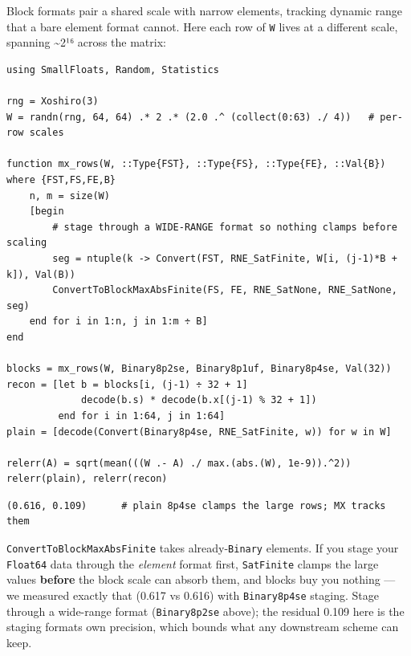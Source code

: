 \label{18175628149299408468}{}


Block formats pair a shared scale with narrow elements, tracking dynamic range that a bare element format cannot. Here each row of \texttt{W} lives at a different scale, spanning {\textasciitilde}2¹⁶ across the matrix:




\begin{verbatim}
using SmallFloats, Random, Statistics

rng = Xoshiro(3)
W = randn(rng, 64, 64) .* 2 .* (2.0 .^ (collect(0:63) ./ 4))   # per-row scales

function mx_rows(W, ::Type{FST}, ::Type{FS}, ::Type{FE}, ::Val{B}) where {FST,FS,FE,B}
    n, m = size(W)
    [begin
        # stage through a WIDE-RANGE format so nothing clamps before scaling
        seg = ntuple(k -> Convert(FST, RNE_SatFinite, W[i, (j-1)*B + k]), Val(B))
        ConvertToBlockMaxAbsFinite(FS, FE, RNE_SatNone, RNE_SatNone, seg)
    end for i in 1:n, j in 1:m ÷ B]
end

blocks = mx_rows(W, Binary8p2se, Binary8p1uf, Binary8p4se, Val(32))
recon = [let b = blocks[i, (j-1) ÷ 32 + 1]
             decode(b.s) * decode(b.x[(j-1) % 32 + 1])
         end for i in 1:64, j in 1:64]
plain = [decode(Convert(Binary8p4se, RNE_SatFinite, w)) for w in W]

relerr(A) = sqrt(mean(((W .- A) ./ max.(abs.(W), 1e-9)).^2))
relerr(plain), relerr(recon)
\end{verbatim}




\begin{verbatim}
(0.616, 0.109)      # plain 8p4se clamps the large rows; MX tracks them
\end{verbatim}



\begin{tcolorbox}[toptitle=-1mm,bottomtitle=1mm,colback=admonition-warning!50!white,colframe=admonition-warning,title=\textbf{Stage wide, then block-quantize}]
\texttt{ConvertToBlockMaxAbsFinite} takes already-\texttt{Binary} elements. If you stage your \texttt{Float64} data through the \emph{element} format first, \texttt{SatFinite} clamps the large values \textbf{before} the block scale can absorb them, and blocks buy you nothing — we measured exactly that (0.617 vs 0.616) with \texttt{Binary8p4se} staging. Stage through a wide-range format (\texttt{Binary8p2se} above); the residual 0.109 here is the staging format{\textquotesingle}s own precision, which bounds what any downstream scheme can keep.

\end{tcolorbox}


